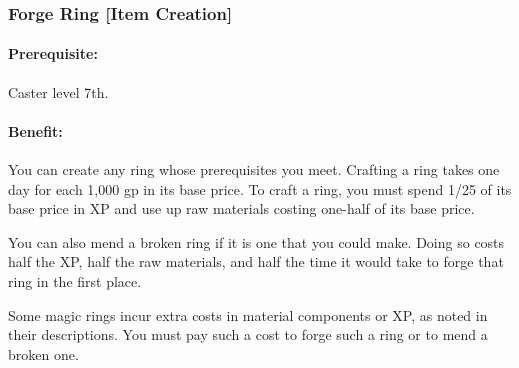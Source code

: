 % 
% 
\subsubsection[Forge Ring]{Forge Ring [Item Creation]}
\label{Feat:ForgeRing}
\paragraph{Prerequisite:} 
Caster level 7th.
\paragraph{Benefit:}
You can create any ring whose prerequisites you meet. 
Crafting a ring takes one day for each 1,000 gp in its base price. 
To craft a ring, you must spend 1/25 of its base price in XP and use up raw materials costing one-half of its base price.
 
You can also mend a broken ring if it is one that you could make. 
Doing so costs half the XP, half the raw materials, and half the time it would take to forge that ring in the first place.

Some magic rings incur extra costs in material components or XP, as noted in their descriptions. 
You must pay such a cost to forge such a ring or to mend a broken one.

